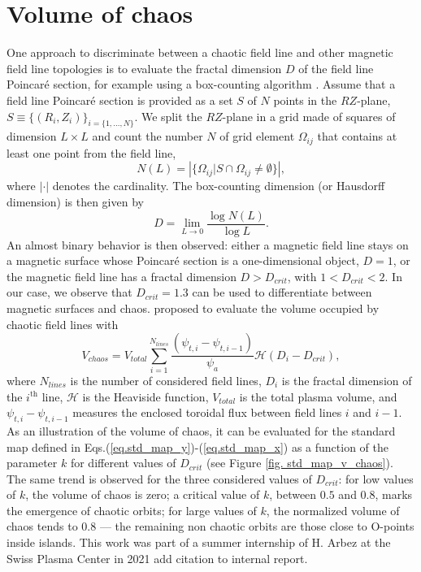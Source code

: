 \documentclass[my_thesis.tex]{subfiles}
\begin{document}
\section{Volume of chaos} \label{sec.volume chaos}
One approach to discriminate between a chaotic field line and other magnetic field line topologies is to evaluate the fractal dimension $D$ of the field line Poincar\'e section, for example using a box-counting algorithm \citep{Meiss1992c}. Assume that a field line Poincar\'e section is provided as a set $S$ of $N$ points in the $RZ$-plane, $S\equiv\{(R_i,Z_i)\}_{i=\{1,\ldots,N\}}$. We split the $RZ$-plane in a grid made of squares of dimension $L\times L$ and count the number $N$ of grid element $\Omega_{ij}$ that contains at least one point from the field line,
\begin{equation}
    N(L) = \left|\{\Omega_{ij}|S\cap\Omega_{ij}\neq\emptyset\}\right|,
\end{equation}
where $|\cdot|$ denotes the cardinality. The box-counting dimension (or Hausdorff dimension) is then given by
\begin{equation}
    D = \lim_{L\rightarrow 0} \frac{\log N(L)}{\log L}.
\end{equation}
An almost binary behavior is then observed: either a magnetic field line stays on a magnetic surface whose Poincar\'e section is a one-dimensional object, $D=1$, or the magnetic field line has a fractal dimension $D>D_{crit}$, with $1<D_{crit}<2$. In our case, we observe that $D_{crit}=1.3$ can be used to differentiate between magnetic surfaces and chaos.
\citet{Loizu2017} proposed to evaluate the volume occupied by chaotic field lines with
\begin{equation}
	V_{chaos} = V_{total} \sum_{i=1}^{N_{lines}} \frac{(\psi_{t,i}-\psi_{t,i-1})}{\psi_a}\mathcal{H}(D_i-D_{crit}), \label{eq.volume chaos}
\end{equation}
where $N_{lines}$ is the number of considered field lines, $D_i$ is the fractal dimension of the $i^{\text{th}}$ line, $\mathcal{H}$ is the Heaviside function, $V_{total}$ is the total plasma volume, and $\psi_{t,i}-\psi_{t,i-1}$ measures the enclosed toroidal flux between field lines $i$ and $i-1$. As an illustration of the volume of chaos, it can be evaluated for the standard map defined in Eqs.(\ref{eq.std_map_y})-(\ref{eq.std_map_x}) as a function of the parameter $k$ for different values of $D_{crit}$ (see Figure \ref{fig. std_map_v_chaos}). The same trend is observed for the three considered values of $D_{crit}$: for low values of $k$, the volume of chaos is zero; a critical value of $k$, between $0.5$ and $0.8$, marks the emergence of chaotic orbits; for large values of $k$, the normalized volume of chaos tends to $0.8$ --- the remaining non chaotic orbits are those close to O-points inside islands. This work was part of a summer internship of H. Arbez at the Swiss Plasma Center in 2021 {\color{red} add citation to internal report}. 
\end{document}
